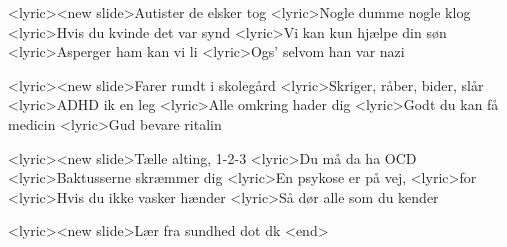 <lyric><new slide>Autister de elsker tog
<lyric>Nogle dumme nogle klog
<lyric>Hvis du kvinde det var synd
<lyric>Vi kan kun hjælpe din søn
<lyric>Asperger ham kan vi li
<lyric>Ogs’ selvom han var nazi

<lyric><new slide>Farer rundt i skolegård
<lyric>Skriger, råber, bider, slår
<lyric>ADHD ik en leg
<lyric>Alle omkring hader dig
<lyric>Godt du kan få medicin
<lyric>Gud bevare ritalin

<lyric><new slide>Tælle alting, 1-2-3
<lyric>Du må da ha OCD
<lyric>Baktusserne skræmmer dig
<lyric>En psykose er på vej,
<lyric>for 
<lyric>Hvis du ikke vasker hænder
<lyric>Så dør alle som du kender 

<lyric><new slide>Lær fra sundhed dot dk
<end>
